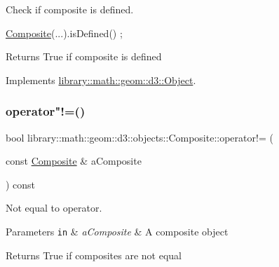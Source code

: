 Check if composite is defined. 


\begin{DoxyCode}
\hyperlink{classlibrary_1_1math_1_1geom_1_1d3_1_1objects_1_1_composite_a65acc162c125c6ad463b26f21cb87c39}{Composite}(...).isDefined() ;
\end{DoxyCode}


\begin{DoxyReturn}{Returns}
True if composite is defined 
\end{DoxyReturn}


Implements \hyperlink{classlibrary_1_1math_1_1geom_1_1d3_1_1_object_a2216442e322f0c3ca5f01a4efa22baf7}{library\+::math\+::geom\+::d3\+::\+Object}.

\mbox{\label{classlibrary_1_1math_1_1geom_1_1d3_1_1objects_1_1_composite_a8dbf350666d7dd33a4ada8f7172dab22}} 
\subsubsection{\texorpdfstring{operator"!=()}{operator!=()}}
{\footnotesize\ttfamily bool library\+::math\+::geom\+::d3\+::objects\+::\+Composite\+::operator!= (\begin{DoxyParamCaption}\item[{const \hyperlink{classlibrary_1_1math_1_1geom_1_1d3_1_1objects_1_1_composite}{Composite} \&}]{a\+Composite }\end{DoxyParamCaption}) const}



Not equal to operator. 


\begin{DoxyParams}[1]{Parameters}
\mbox{\tt in}  & {\em a\+Composite} & A composite object \\
\hline
\end{DoxyParams}
\begin{DoxyReturn}{Returns}
True if composites are not equal 
\end{DoxyReturn}
\mbox{\label{classlibrary_1_1math_1_1geom_1_1d3_1_1objects_1_1_composite_a733b579f812eec28d898931c2597af8e}} 
